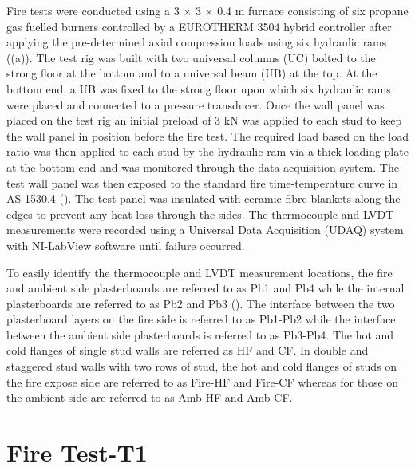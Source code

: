 Fire tests were conducted using a 3 \(\times\) 3 \(\times\) 0.4 m furnace consisting of six propane gas fuelled burners controlled by a EUROTHERM 3504 hybrid controller after applying the pre-determined axial compression loads using six hydraulic rams ((a)). The test rig was built with two universal columns (UC) bolted to the strong floor at the bottom and to a universal beam (UB) at the top. At the bottom end, a UB was fixed to the strong floor upon which six hydraulic rams were placed and connected to a pressure transducer. Once the wall panel was placed on the test rig an initial preload of 3 kN was applied to each stud to keep the wall panel in position before the fire test. The required load based on the load ratio was then applied to each stud by the hydraulic ram via a thick loading plate at the bottom end and was monitored through the data acquisition system. The test wall panel was then exposed to the standard fire time-temperature curve in AS 1530.4 (\cite{StandardsAustral2014}). The test panel was insulated with ceramic fibre blankets along the edges to prevent any heat loss through the sides. The thermocouple and LVDT measurements were recorded using a Universal Data Acquisition (UDAQ) system with NI-LabView software until failure occurred. 

To easily identify the thermocouple and LVDT measurement locations, the fire and ambient side plasterboards are referred to as Pb1 and Pb4 while the internal plasterboards are referred to as Pb2 and Pb3 (). The interface between the two plasterboard layers on the fire side is referred to as Pb1-Pb2 while the interface between the ambient side plasterboards is referred to as Pb3-Pb4. The hot and cold flanges of single stud walls are referred as HF and CF. In double and staggered stud walls with two rows of stud, the hot and cold flanges of studs on the fire expose side are referred to as Fire-HF and Fire-CF whereas for those on the ambient side are referred to as Amb-HF and Amb-CF.

\section{Fire Test-T1}

